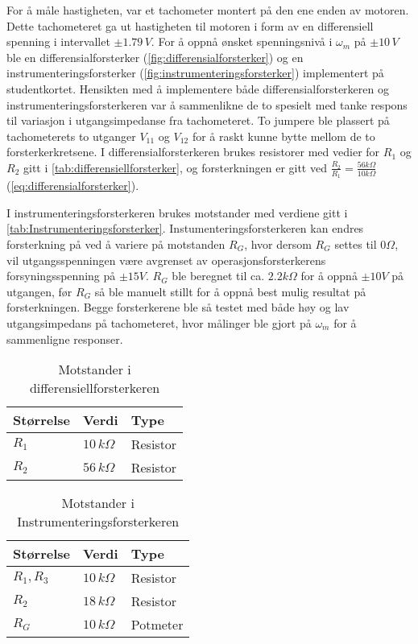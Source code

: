 For å måle hastigheten, var et tachometer montert på den ene enden av motoren. Dette tachometeret ga ut hastigheten til motoren i form av en differensiell spenning i intervallet $\pm1.79\,V$. For å oppnå ønsket spenningsnivå i $\omega_m$ på $\pm10\,V$ ble en differensialforsterker (\autoref{fig:differensialforsterker}) og en instrumenteringsforsterker (\autoref{fig:instrumenteringsforsterker}) implementert på studentkortet.
Hensikten med å implementere både differensialforsterkeren og instrumenteringsforsterkeren var å sammenlikne de to spesielt med tanke respons til variasjon i utgangsimpedanse fra tachometeret.
To jumpere ble plassert på tachometerets to utganger $V_{11}$ og $V_{12}$ for å raskt kunne bytte mellom de to forsterkerkretsene. I differensialforsterkeren brukes resistorer med vedier for $R_1$ og $R_2$ gitt i \autoref{tab:differensiellforsterker}, og forsterkningen er gitt ved $\frac{R_2}{R_1} = \frac{56k\Omega}{10k\Omega}$(\autoref{eq:differensialforsterker}).

I instrumenteringsforsterkeren brukes motstander med verdiene gitt i \autoref{tab:Instrumenteringsforsterker}. Instumenteringsforsterkeren kan endres forsterkning på ved å variere på motstanden $R_G$, hvor dersom $R_G$ settes til $0\Omega$, vil utgangsspenningen være avgrenset av operasjonsforsterkerens forsyningsspenning på $\pm15V$. $R_G$ ble beregnet til ca. $2.2k\Omega$ for å oppnå $\pm10V$ på utgangen, før $R_G$ så ble manuelt stillt for å oppnå best mulig resultat på forsterkningen. Begge forsterkerene ble så testet med både høy og lav utgangsimpedans på tachometeret, hvor målinger ble gjort på $\omega_m$ for å sammenligne responser.


\begin{table}[h]
	\centering
    \caption{Motstander i differensiellforsterkeren}
	\begin{tabular}{lll}
		\toprule
		Størrelse & Verdi & Type \\
		\midrule
        $R_1$ & $10\,k\Omega$& Resistor \\
        $R_2$ & $56\,k\Omega$ & Resistor\\
		\bottomrule
	\end{tabular}
\label{tab:differensiellforsterker}
\end{table}


\begin{table}[h]
	\centering
    \caption{Motstander i Instrumenteringsforsterkeren}
	\begin{tabular}{lll}
		\toprule
		Størrelse & Verdi & Type \\
		\midrule
        $R_1, R_3$ & $10\,k\Omega$& Resistor \\
        $R_2$ & $18\,k\Omega$ & Resistor\\
        $R_G$ & $10\,k\Omega$ & Potmeter\\
		\bottomrule
	\end{tabular}
    \label{tab:Instrumenteringsforsterker}
\end{table}

